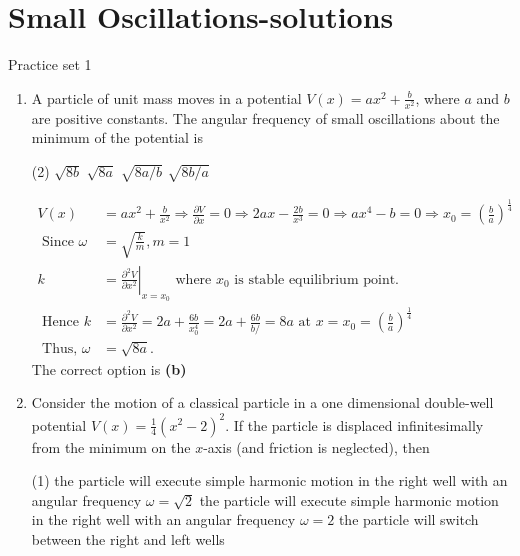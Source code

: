\chapter{Small Oscillations-solutions}
\begin{abox}
	Practice set 1
\end{abox}
\begin{enumerate}
		\item  A particle of unit mass moves in a potential $V(x)=a x^{2}+\frac{b}{x^{2}}$, where $a$ and $b$ are positive constants. The angular frequency of small oscillations about the minimum of the potential is
		{}
	\begin{tasks}(2)
		\task[\textbf{A.}] $\sqrt{8 b}$
		\task[\textbf{B.}]$\sqrt{8 a}$
		\task[\textbf{C.}] $\sqrt{8 a / b}$
		\task[\textbf{D.}]$\sqrt{8 b / a}$
	\end{tasks}
	\begin{answer}
		\begin{align*}
		V(x)&=a x^{2}+\frac{b}{x^{2}} \Rightarrow \frac{\partial V}{\partial x}=0 \Rightarrow 2 a x-\frac{2 b}{x^{3}}=0 \Rightarrow a x^{4}-b=0 \Rightarrow x_{0}=\left(\frac{b}{a}\right)^{\frac{1}{4}}\\
		\text { Since } \omega&=\sqrt{\frac{k}{m}}, m=1\\
		k&=\left.\frac{\partial^{2} V}{\partial x^{2}}\right|_{x=x_{0}} \text { where } x_{0} \text { is stable equilibrium point. }\\
		\text { Hence } k&=\frac{\partial^{2} V}{\partial x^{2}}=2 a+\frac{6 b}{x_{0}^{4}}=2 a+\frac{6 b}{b /}=8 a \text { at } x=x_{0}=\left(\frac{b}{a}\right)^{\frac{1}{4}}\\
		\text { Thus, } \omega&=\sqrt{8 a} \text {. }
		\end{align*}
		The correct option is \textbf{(b)}
	\end{answer}
		\item Consider the motion of a classical particle in a one dimensional double-well potential $V(x)=\frac{1}{4}\left(x^{2}-2\right)^{2} .$ If the particle is displaced infinitesimally from the minimum on the $x$-axis (and friction is neglected), then
		{}
	\begin{tasks}(1)
		\task[\textbf{A.}] the particle will execute simple harmonic motion in the right well with an angular frequency $\omega=\sqrt{2}$
		\task[\textbf{B.}]the particle will execute simple harmonic motion in the right well with an angular frequency $\omega=2$
		\task[\textbf{C.}]the particle will switch between the right and left wells

\end{tasks}
\end{enumerate}
